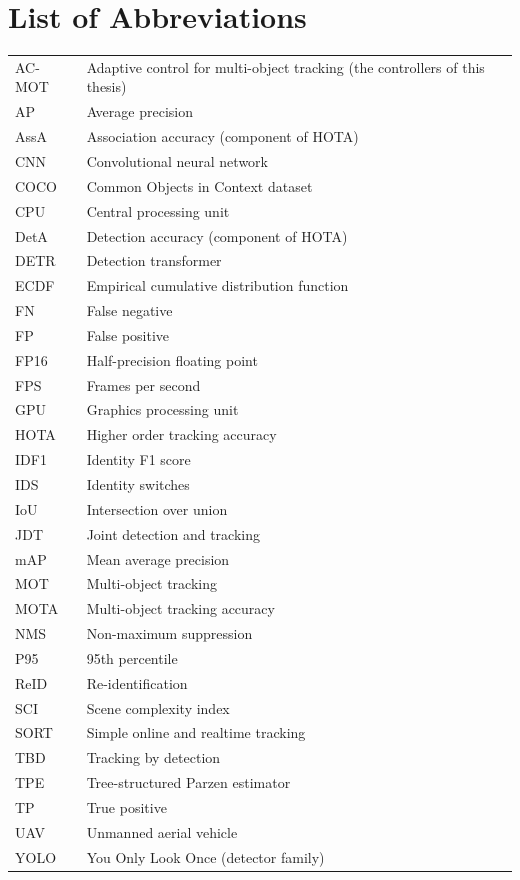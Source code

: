 \chapter*{List of Abbreviations}
\thispagestyle{plain}
\begin{longtable}{@{}p{3.2cm}>{\raggedright\arraybackslash}p{11cm}@{}}
AC-MOT & Adaptive control for multi-object tracking (the controllers of this thesis) \\
AP & Average precision \\
AssA & Association accuracy (component of HOTA) \\
CNN & Convolutional neural network \\
COCO & Common Objects in Context dataset \\
CPU & Central processing unit \\
DetA & Detection accuracy (component of HOTA) \\
DETR & Detection transformer \\
ECDF & Empirical cumulative distribution function \\
FN & False negative \\
FP & False positive \\
FP16 & Half-precision floating point \\
FPS & Frames per second \\
GPU & Graphics processing unit \\
HOTA & Higher order tracking accuracy \\
IDF1 & Identity F1 score \\
IDS & Identity switches \\
IoU & Intersection over union \\
JDT & Joint detection and tracking \\
mAP & Mean average precision \\
MOT & Multi-object tracking \\
MOTA & Multi-object tracking accuracy \\
NMS & Non-maximum suppression \\
P95 & 95th percentile \\
ReID & Re-identification \\
SCI & Scene complexity index \\
SORT & Simple online and realtime tracking \\
TBD & Tracking by detection \\
TPE & Tree-structured Parzen estimator \\
TP & True positive \\
UAV & Unmanned aerial vehicle \\
YOLO & You Only Look Once (detector family) \\
\end{longtable}
